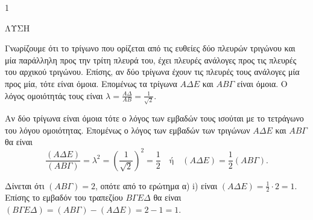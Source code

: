 \begin{ylh}{1}
    \item [Ύλη από εικόνα]
\end{ylh}
ΛΥΣΗ
\begin{alist}
    \item \begin{rlist}
        \item Γνωρίζουμε ότι το τρίγωνο που ορίζεται από τις ευθείες δύο πλευρών τριγώνου και μία παράλληλη προς την τρίτη πλευρά του, έχει πλευρές ανάλογες προς τις πλευρές του αρχικού τριγώνου. Επίσης, αν δύο τρίγωνα έχουν τις πλευρές τους ανάλογες μία προς μία, τότε είναι όμοια. Επομένως τα τρίγωνα $A\Delta E$ και $AB\Gamma$ είναι όμοια. Ο λόγος ομοιότητάς τους είναι $\lambda = \frac{A\Delta}{AB} = \frac{1}{\sqrt{2}}$.
        \item Αν δύο τρίγωνα είναι όμοια τότε ο λόγος των εμβαδών τους ισούται με το τετράγωνο του λόγου ομοιότητας. Επομένως ο λόγος των εμβαδών των τριγώνων $A\Delta E$ και $AB\Gamma$ θα είναι
        \[ \frac{(A\Delta E)}{(AB\Gamma)} = \lambda^2 = \left(\frac{1}{\sqrt{2}}\right)^2 = \frac{1}{2} \quad \text{ή} \quad (A\Delta E) = \frac{1}{2} (AB\Gamma). \]
    \end{rlist}
    \item Δίνεται ότι $(AB\Gamma) = 2$, οπότε από το ερώτημα α) i) είναι $(A\Delta E) = \frac{1}{2} \cdot 2 = 1$. Επίσης το εμβαδόν του τραπεζίου $B\Gamma E\Delta$ θα είναι $(B\Gamma E\Delta) = (AB\Gamma) - (A\Delta E) = 2 - 1 = 1$.
\end{alist}